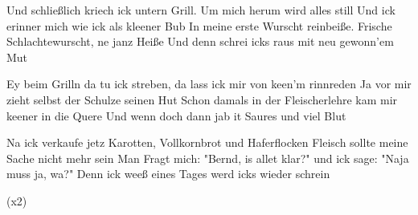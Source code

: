 \begin{guitar}
	Und schließlich kriech ick untern Grill. Um mich herum wird alles still
	Und ick erinner mich wie ick als kleener Bub
	In meine erste Wurscht reinbeiße. Frische Schlachtewurscht, ne janz Heiße
	Und denn schrei icks raus mit neu gewonn'em Mut\vspace{-0.08em}
	
	 \vspace{-0.08em}
	
	Ey beim Grilln da tu ick streben, da lass ick mir von keen'm rinnreden
	Ja vor mir zieht selbst der Schulze seinen Hut
	Schon damals in der Fleischerlehre kam mir keener in die Quere
	Und wenn doch dann jab it Saures und viel Blut\vspace{-0.08em}
	
	Na ick verkaufe jetz Karotten, Vollkornbrot und Haferflocken
	Fleisch sollte meine Sache nicht mehr sein
	Man Fragt mich: "Bernd, is allet klar?" und ick sage: "Naja muss ja, wa?"
	Denn ick weeß eines Tages werd icks wieder schrein\vspace{-0.08em}
	
	  (x2)
\end{guitar}